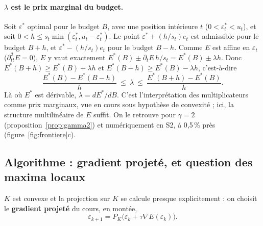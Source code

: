 \documentclass[11pt,a4paper]{article}
\theoremstyle{plain}
\theoremstyle{definition}
\begin{document}
\paragraph{$\lambda$ est le prix marginal du budget.} Soit $\varepsilon^*$ optimal pour le budget $B$, avec une position intérieure $t$ ($0<\varepsilon^*_t<u_t$), et soit $0<h\le s_t\min(\varepsilon^*_t,u_t-\varepsilon^*_t)$. Le point $\varepsilon^*+(h/s_t)e_t$ est admissible pour le budget $B+h$, et $\varepsilon^*-(h/s_t)e_t$ pour le budget $B-h$. Comme $E$ est affine en $\varepsilon_t$ ($\partial^2_{tt}E=0$), $E$ y vaut exactement $E^*(B)\pm\partial_tE\,h/s_t=E^*(B)\pm\lambda h$. Donc $E^*(B+h)\ge E^*(B)+\lambda h$ et $E^*(B-h)\ge E^*(B)-\lambda h$, c'est-à-dire
\begin{equation}\label{eq:encadrement}
\frac{E^*(B)-E^*(B-h)}{h}\ \le\ \lambda\ \le\ \frac{E^*(B+h)-E^*(B)}{h}.
\end{equation}
Là où $E^*$ est dérivable, $\lambda=dE^*/dB$. C'est l'interprétation des multiplicateurs comme prix marginaux, vue en cours sous hypothèse de convexité ; ici, la structure multilinéaire de $E$ suffit. On le retrouve pour $\gamma=2$ (proposition~\ref{prop:gamma2}) et numériquement en S2, à 0,5\,\% près (figure~\ref{fig:frontiere}c).

\subsection{Algorithme : gradient projeté, et question des maxima locaux}\label{sec:algoII}
$K$ est convexe et la projection sur $K$ se calcule presque explicitement : on choisit le \textbf{gradient projeté} du cours, en montée,
\[\varepsilon_{k+1}=P_K\big(\varepsilon_k+\tau\nabla E(\varepsilon_k)\big).\]
\end{document}
